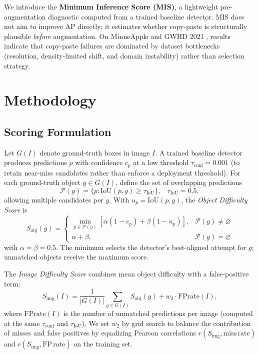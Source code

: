 \documentclass[conference]{IEEEtran}
\begin{document}
We introduce the \textbf{Minimum Inference Score (MIS)}, a lightweight pre-augmentation diagnostic computed from a trained baseline detector.
MIS does not aim to improve AP directly; it estimates whether copy-paste is structurally plausible \textit{before} augmentation.
On MinneApple \cite{hani2020minneapple} and GWHD 2021 \cite{david2021global},
 results indicate that copy-paste failures are dominated by 
 dataset bottlenecks (resolution, density-limited shift, and domain instability) 
 rather than selection strategy.


\section{Methodology}
\subsection{Scoring Formulation}
Let $G(I)$ denote ground-truth boxes in image $I$. A trained baseline detector
produces predictions $p$ with confidence $c_p$ at a low threshold
$\tau_{\mathrm{conf}}{=}0.001$ (to retain near-miss candidates rather than enforce a deployment threshold).
For each ground-truth object $g\in G(I)$, define the set of overlapping predictions
\[
\mathcal{P}(g) = \{p : \mathrm{IoU}(p,g) \ge \tau_{\mathrm{IoU}}\}, \;\;\; \tau_{\mathrm{IoU}}{=}0.5,
\]
allowing multiple candidates per $g$.
With $u_p=\mathrm{IoU}(p,g)$, the \textit{Object Difficulty Score} is
\begin{equation}
S_{\mathrm{obj}}(g) =
\begin{cases}
  \min_{p \in \mathcal{P}(g)}
    \left[\alpha(1{-}c_p) + \beta(1{-}u_p)\right],
    & \mathcal{P}(g) \neq \varnothing \\[3pt]
  \alpha + \beta, & \mathcal{P}(g) = \varnothing
\end{cases}
\label{eq:obj}
\end{equation}
with $\alpha{=}\beta{=}0.5$. The minimum selects the detector's best-aligned attempt for $g$;
unmatched objects receive the maximum score.

The \textit{Image Difficulty Score} combines mean object difficulty with a false-positive term:
\begin{equation}
S_{\mathrm{img}}(I)
  = \frac{1}{|G(I)|}\sum_{g \in G(I)} S_{\mathrm{obj}}(g)
  + w_2 \cdot \mathrm{FPrate}(I),
\label{eq:img}
\end{equation}
where $\mathrm{FPrate}(I)$ is the number of unmatched predictions per image (computed at the same
$\tau_{\mathrm{conf}}$ and $\tau_{\mathrm{IoU}}$). We set $w_2$ by grid search to balance the contribution
of misses and false positives by equalizing Pearson correlations
$r(S_{\mathrm{img}},\mathrm{miss\,rate})$ and $r(S_{\mathrm{img}},\mathrm{FP\,rate})$ on the training set.
\end{document}
